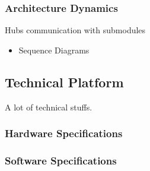 	\subsubsection{Architecture Dynamics}
		Hubs communication with submodules
		\begin{itemize}
			\item Sequence Diagrams
		\end{itemize}
\subsection{Technical Platform}
	A lot of technical stuffs. 
	\subsubsection{Hardware Specifications}
	\subsubsection{Software Specifications}


